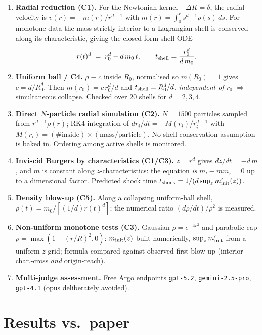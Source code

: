 \documentclass[11pt]{article}
\begin{document}
\begin{enumerate}
\item \textbf{Radial reduction (C1).} For the Newtonian kernel
$-\Delta K=\delta$, the radial velocity is $v(r)=-m(r)/r^{d-1}$ with
$m(r)=\int_0^r s^{d-1}\rho(s)\,ds$. For monotone data the mass strictly
interior to a Lagrangian shell is conserved along its characteristic, giving
the closed-form shell ODE
\begin{equation}
r(t)^d \;=\; r_0^d - d\,m_0\,t, \qquad t_{\rm shell}=\frac{r_0^d}{d\,m_0}.
\end{equation}
\item \textbf{Uniform ball / C4.} $\rho\equiv c$ inside $R_0$, normalised so
$m(R_0)=1$ gives $c=d/R_0^d$. Then $m(r_0)=c\,r_0^d/d$ and
$t_{\rm shell}=R_0^d/d$, \emph{independent of $r_0$} $\Rightarrow$
simultaneous collapse. Checked over 20 shells for $d=2,3,4$.
\item \textbf{Direct $N$-particle radial simulation (C2).} $N\!=\!1500$
particles sampled from $r^{d-1}\rho(r)$; RK4 integration of
$dr_i/dt=-M(r_i)/r_i^{d-1}$ with $M(r_i)=(\text{\# inside})\times(\text{mass/particle})$.
No shell-conservation assumption is baked in. Ordering among active shells
is monitored.
\item \textbf{Inviscid Burgers by characteristics (C1/C3).} $z\!=\!r^d$
gives $dz/dt=-d\,m$, and $m$ is constant along $z$-characteristics: the
equation \emph{is} $m_t-m m_z=0$ up to a dimensional factor. Predicted shock
time $t_{\rm shock}=1/(d\sup_z m'_{\rm init}(z))$.
\item \textbf{Density blow-up (C5).} Along a collapsing uniform-ball shell,
$\rho(t)=m_0/[(1/d)r(t)^d]$; the numerical ratio $(d\rho/dt)/\rho^2$ is
measured.
\item \textbf{Non-uniform monotone tests (C3).} Gaussian $\rho=e^{-4r^2}$ and
parabolic cap $\rho=\max(1-(r/R)^2,0)$: $m_{\rm init}(z)$ built numerically,
$\sup_z m'_{\rm init}$ from a uniform-$z$ grid; formula compared against
observed first blow-up (interior char.-cross \emph{and} origin-reach).
\item \textbf{Multi-judge assessment.} Free Argo endpoints \texttt{gpt-5.2},
\texttt{gemini-2.5-pro}, \texttt{gpt-4.1} (opus deliberately avoided).
\end{enumerate}

\section{Results vs.\ paper}
\end{document}
